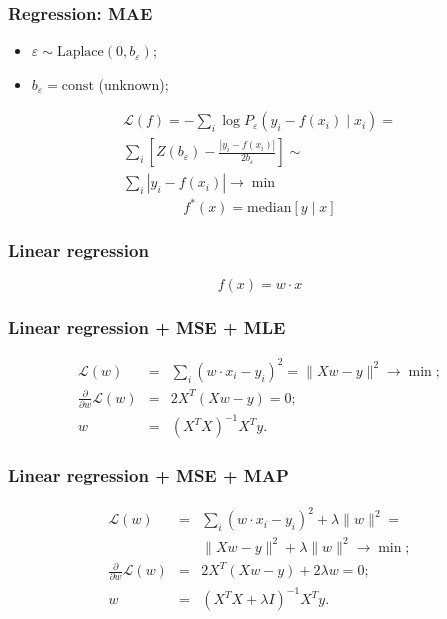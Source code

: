 \documentclass[mathserif, aspectratio=43]{beamer}
\begin{document}
\begin{frame}[fragile]
\frametitle{Regression: MAE}
\begin{itemize}
\item $\varepsilon \sim \mathrm{Laplace}(0, b_\varepsilon)$;
\item $b_\varepsilon = \mathrm{const}$ (unknown);
\end{itemize}
\begin{multline*}
  \mathcal{L}(f) = -\sum_i \log P_\varepsilon(y_i - f(x_i) \mid x_i) = \\
    \sum_i \left[ Z(b_\varepsilon) - \frac{|y_i - f(x_i)|}{2 b_\varepsilon}\right] \sim \\
    \sum_i |y_i - f(x_i)| \to \min
\end{multline*}
\begin{equation*}
  f^*(x) = \mathrm{median}\left[ y \mid x \right]
\end{equation*}

\end{frame}


\begin{frame}[fragile]
\frametitle{Linear regression}
$$f(x) = w \cdot x$$


\end{frame}


\begin{frame}[fragile]
\frametitle{Linear regression + MSE + MLE}
\begin{eqnarray*}
  \mathcal{L}(w) &=& \sum_i (w \cdot x_i - y_i) ^ 2 = \|X w - y\|^2 \to \min;\\
  \frac{\partial}{\partial w}\mathcal{L}(w) &=& 2 X^T (X w - y) = 0;\\
  w &=& (X^T X)^{-1} X^T y.
\end{eqnarray*}

\end{frame}


\begin{frame}[fragile]
\frametitle{Linear regression + MSE + MAP}
\begin{eqnarray*}
  \mathcal{L}(w) &=& \sum_i (w \cdot x_i - y_i) ^ 2 + \lambda \|w\|^2 =\\
    && \|X w - y\|^2 + \lambda \|w\|^2\to \min;\\
  \frac{\partial}{\partial w}\mathcal{L}(w) &=& 2 X^T (X w - y) + 2 \lambda w= 0;\\
  w &=& (X^T X + \lambda I)^{-1} X^T y.
\end{eqnarray*}

\end{frame}
\end{document}
